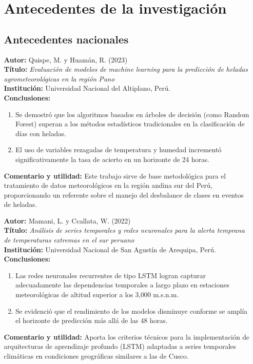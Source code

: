 \section{Antecedentes de la investigación}
\label{sec:antecedentes}

\subsection{Antecedentes nacionales}

\noindent
\textbf{Autor:} Quispe, M. y Huamán, R. (2023) \\
\textbf{Título:} \textit{Evaluación de modelos de machine learning para la predicción de heladas agrometeorológicas en la región Puno} \\
\textbf{Institución:} Universidad Nacional del Altiplano, Perú. \\
\textbf{Conclusiones:} 
\begin{enumerate}
    \item Se demostró que los algoritmos basados en árboles de decisión (como Random Forest) superan a los métodos estadísticos tradicionales en la clasificación de días con heladas.
    \item El uso de variables rezagadas de temperatura y humedad incrementó significativamente la tasa de acierto en un horizonte de 24 horas.
\end{enumerate}
\noindent\textbf{Comentario y utilidad:} Este trabajo sirve de base metodológica para el tratamiento de datos meteorológicos en la región andina sur del Perú, proporcionando un referente sobre el manejo del desbalance de clases en eventos de heladas.

\vspace{0.3cm}

\noindent
\textbf{Autor:} Mamani, L. y Ccallata, W. (2022) \\
\textbf{Título:} \textit{Análisis de series temporales y redes neuronales para la alerta temprana de temperaturas extremas en el sur peruano} \\
\textbf{Institución:} Universidad Nacional de San Agustín de Arequipa, Perú. \\
\textbf{Conclusiones:} 
\begin{enumerate}
    \item Las redes neuronales recurrentes de tipo LSTM logran capturar adecuadamente las dependencias temporales a largo plazo en estaciones meteorológicas de altitud superior a los 3,000 m.s.n.m.
    \item Se evidenció que el rendimiento de los modelos disminuye conforme se amplía el horizonte de predicción más allá de las 48 horas.
\end{enumerate}
\noindent\textbf{Comentario y utilidad:} Aporta los criterios técnicos para la implementación de arquitecturas de aprendizaje profundo (LSTM) adaptadas a series temporales climáticas en condiciones geográficas similares a las de Cusco.

